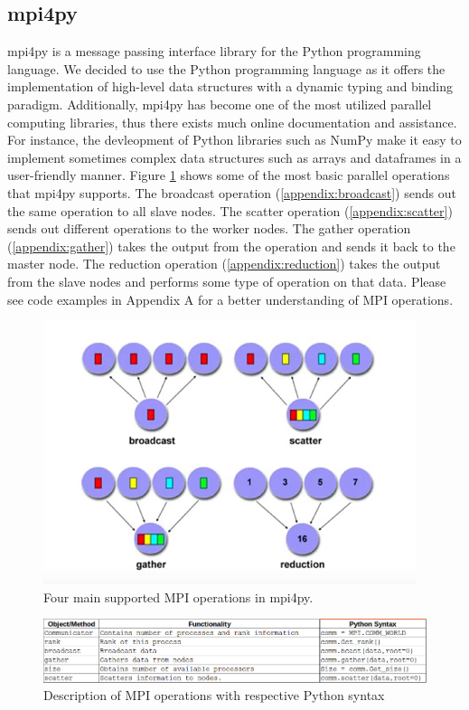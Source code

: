 \subsection{mpi4py}
	mpi4py is a message passing interface library for the Python programming language. We decided to use the Python programming language as it offers the implementation of high-level data structures with a dynamic typing and binding paradigm. Additionally, mpi4py has become one of the most utilized parallel computing libraries, thus there exists much online documentation and assistance. For instance, the devleopment of Python libraries such as NumPy make it easy to implement sometimes complex data structures such as arrays and dataframes in a user-friendly manner. Figure \ref{fig:MPI Operations} shows some of the most basic parallel operations that mpi4py supports. The broadcast operation (\ref{appendix:broadcast}) sends out the same operation to all slave nodes. The scatter operation (\ref{appendix:scatter}) sends out different operations to the worker nodes. The gather operation (\ref{appendix:gather}) takes the output from the operation and sends it back to the master node. The reduction operation (\ref{appendix:reduction}) takes the output from the slave nodes and performs some type of operation on that data. Please see code examples in Appendix A for a better understanding of MPI operations.
	
	
\begin{figure}
\centering
\includegraphics{Figures/mpi-diagram}
\decoRule
\caption[MPI Operations]{Four main supported MPI operations in mpi4py.}
\label{fig:MPI Operations}
\end{figure}

\begin{figure}
\centering
\includegraphics[scale=0.5]{Figures/table-syntax}
\decoRule
\caption[MPI Table]{Description of MPI operations with respective Python syntax}
\label{fig:MPI Table}
\end{figure}

